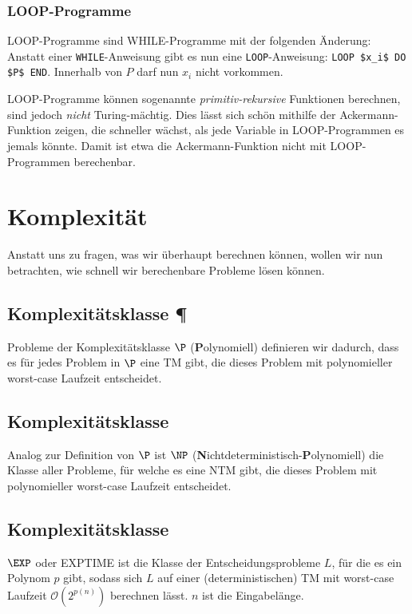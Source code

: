 \documentclass[a4paper,parskip=half*,DIV=7,fontsize=11pt]{scrartcl}
\begin{document}
\subsubsection{LOOP-Programme}
LOOP-Programme sind WHILE-Programme mit der folgenden Änderung: Anstatt einer \lstinline{WHILE}-Anweisung gibt es nun eine \lstinline{LOOP}-Anweisung: \lstinline{LOOP $x_i$ DO $P$ END}. Innerhalb von $P$ darf nun $x_i$ nicht vorkommen.

LOOP-Programme können sogenannte \textit{primitiv-rekursive} Funktionen berechnen, sind jedoch \emph{nicht} Turing-mächtig. Dies lässt sich schön mithilfe der Ackermann-Funktion zeigen, die schneller wächst, als jede Variable in LOOP-Programmen es jemals könnte. Damit ist etwa die Ackermann-Funktion nicht mit LOOP-Programmen berechenbar.

\section{Komplexität}
Anstatt uns zu fragen, was wir überhaupt berechnen können, wollen wir nun betrachten, wie schnell wir berechenbare Probleme lösen können.

\subsection[Komplexitätsklasse P]{Komplexitätsklasse \P}
Probleme der Komplexitätsklasse $\P$ (\textbf Polynomiell) definieren wir dadurch, dass es für jedes Problem in $\P$ eine TM gibt, die dieses Problem mit polynomieller worst-case Laufzeit entscheidet.

\subsection[Komplexitätsklasse NP]{Komplexitätsklasse \NP}
Analog zur Definition von $\P$  ist $\NP$  (\textbf Nichtdeterministisch-\textbf Polynomiell) die Klasse aller Probleme, für welche es eine NTM gibt, die dieses Problem mit polynomieller worst-case Laufzeit entscheidet.

\subsection[Komplexitätsklasse EXP]{Komplexitätsklasse \EXP}
$\EXP$ oder EXPTIME ist die Klasse der Entscheidungsprobleme $L$, für die es ein Polynom $p$ gibt, sodass sich $L$ auf einer (deterministischen) TM mit worst-case Laufzeit $\mathcal{O}(2^{p(n)})$ berechnen lässt. $n$ ist die Eingabelänge.
\end{document}
